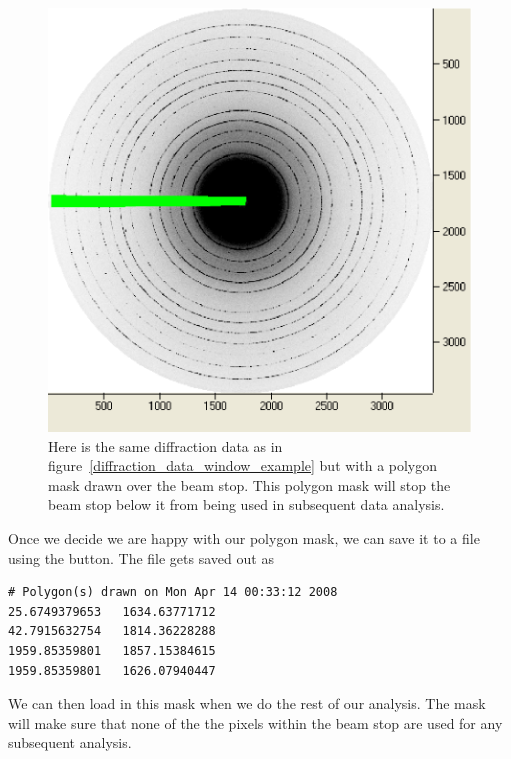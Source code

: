 \begin{figure}
    \centering
    \includegraphics[scale=.75]{figures/masked_beam_stop.eps}
    \caption{Here is the same diffraction data as in 
    figure~\ref{diffraction_data_window_example} but with a
    polygon mask drawn over the beam stop. This polygon mask
    will stop the beam stop below it from being used in
    subsequent data analysis.}
    \label{masked_beam_stop}
\end{figure}

Once we decide we are happy with our polygon mask, we can
save it to a file using the  button.
The file gets saved out as
\begin{lstlisting}[caption={'beam\_stop\_mask.dat'}]
# Polygon(s) drawn on Mon Apr 14 00:33:12 2008
25.6749379653	1634.63771712
42.7915632754	1814.36228288
1959.85359801	1857.15384615
1959.85359801	1626.07940447
\end{lstlisting}
We can then load in this mask when we do the rest of
our analysis. The mask will make sure that none of the
the pixels within the beam stop are used for any subsequent
analysis.

